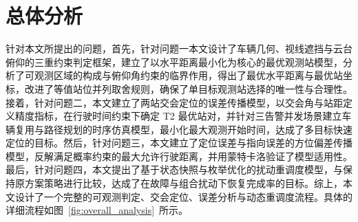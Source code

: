 
\section{总体分析}

针对本文所提出的问题，首先，针对问题一本文设计了车辆几何、视线遮挡与云台俯仰的三重约束判定框架，建立了以水平距离最小化为核心的最优观测站模型，分析了可观测区域的构成与俯仰角约束的临界作用，得出了最优水平距离与最优站坐标，改进了等值站位并列取舍规则，确保了单目标观测站选择的唯一性与合理性。接着，针对问题二，本文建立了两站交会定位的误差传播模型，以交会角与站距定义精度指标，在行驶时间约束下确定 T2 最优站对，并针对三告警并发场景建立车辆复用与路径规划的时序仿真模型，最小化最大观测开始时间，达成了多目标快速定位的目标。然后，针对问题三，本文建立了定位误差与指向误差的方位偏差传播模型，反解满足概率约束的最大允许行驶距离，并用蒙特卡洛验证了模型适用性。最后，针对问题四，本文提出了基于状态快照与枚举优化的扰动重调度模型，与保持原方案策略进行比较，达成了在故障与组合扰动下恢复完成率的目标。综上，本文设计了一个完整的可观测判定、交会定位、误差分析与动态重调度流程。具体的详细流程如图~\ref{fig:overall_analysis}~所示。

